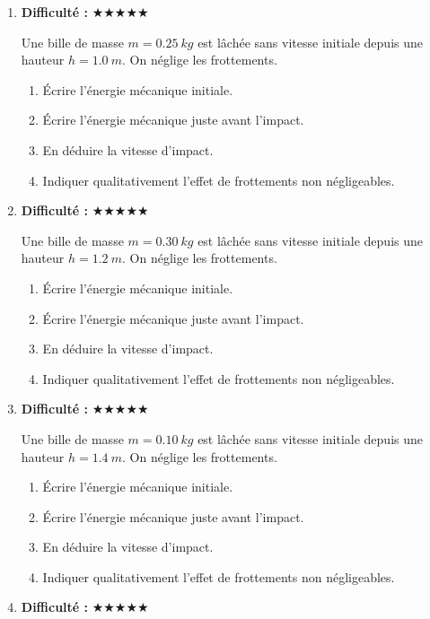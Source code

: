 \documentclass[11pt,a4paper]{article}
\newcommand{\etoiles}[1]{\textbf{Difficulté : }#1}
\begin{document}
\begin{enumerate}[label=\textbf{Exercice \arabic*.},leftmargin=*]
Une bille de masse $m=0.20\ \si{kg}$ est lâchée sans vitesse initiale depuis une hauteur $h=0.8\ \si{m}$.
On néglige les frottements.
\begin{enumerate}[label=\alph*)]
\item Écrire l'énergie mécanique initiale.
\item Écrire l'énergie mécanique juste avant l'impact.
\item En déduire la vitesse d'impact.
\item Indiquer qualitativement l'effet de frottements non négligeables.
\end{enumerate}
\item \etoiles{★★★★★}

Une bille de masse $m=0.25\ \si{kg}$ est lâchée sans vitesse initiale depuis une hauteur $h=1.0\ \si{m}$.
On néglige les frottements.
\begin{enumerate}[label=\alph*)]
\item Écrire l'énergie mécanique initiale.
\item Écrire l'énergie mécanique juste avant l'impact.
\item En déduire la vitesse d'impact.
\item Indiquer qualitativement l'effet de frottements non négligeables.
\end{enumerate}
\item \etoiles{★★★★★}

Une bille de masse $m=0.30\ \si{kg}$ est lâchée sans vitesse initiale depuis une hauteur $h=1.2\ \si{m}$.
On néglige les frottements.
\begin{enumerate}[label=\alph*)]
\item Écrire l'énergie mécanique initiale.
\item Écrire l'énergie mécanique juste avant l'impact.
\item En déduire la vitesse d'impact.
\item Indiquer qualitativement l'effet de frottements non négligeables.
\end{enumerate}
\item \etoiles{★★★★★}

Une bille de masse $m=0.10\ \si{kg}$ est lâchée sans vitesse initiale depuis une hauteur $h=1.4\ \si{m}$.
On néglige les frottements.
\begin{enumerate}[label=\alph*)]
\item Écrire l'énergie mécanique initiale.
\item Écrire l'énergie mécanique juste avant l'impact.
\item En déduire la vitesse d'impact.
\item Indiquer qualitativement l'effet de frottements non négligeables.
\end{enumerate}
\item \etoiles{★★★★★}


\end{enumerate}
\end{document}
